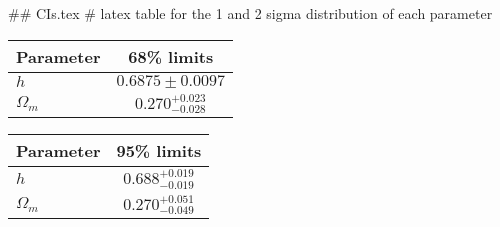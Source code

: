 ## CIs.tex
# latex table for the 1 and 2 sigma distribution of each parameter

\begin{tabular} { l  c}
 Parameter &  68\% limits\\
\hline
{\boldmath$h              $} & $0.6875\pm 0.0097          $\\
{\boldmath$\Omega_m       $} & $0.270^{+0.023}_{-0.028}   $\\
\hline
\end{tabular}

\begin{tabular} { l  c}
 Parameter &  95\% limits\\
\hline
{\boldmath$h              $} & $0.688^{+0.019}_{-0.019}   $\\
{\boldmath$\Omega_m       $} & $0.270^{+0.051}_{-0.049}   $\\
\hline
\end{tabular}
